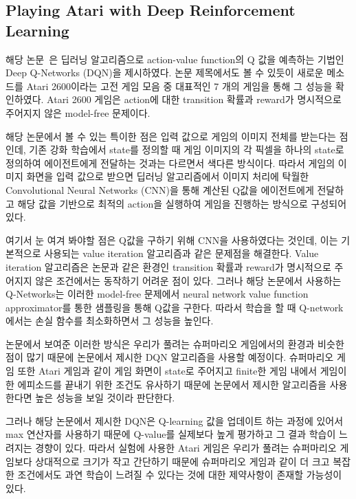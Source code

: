 \subsection{Playing Atari with Deep Reinforcement Learning}
\label{sec:survey:DQN}
해당 논문~\cite{DQN}은 딥러닝 알고리즘으로 action-value function의 Q 값을 예측하는 기법인 Deep Q-Networks (DQN)을 제시하였다. 
논문 제목에서도 볼 수 있듯이 새로운 메소드를 Atari 2600이라는 고전 게임 모음 중 대표적인 7 개의 게임을 통해 그 성능을 확인하였다. 
Atari 2600 게임은 action에 대한 transition 확률과 reward가 명시적으로 주어지지 않은 model-free 문제이다.

해당 논문에서 볼 수 있는 특이한 점은 입력 값으로 게임의 이미지 전체를 받는다는 점인데, 기존 강화 학습에서 state를 정의할 때 게임 이미지의 각 픽셀을 하나의 state로 정의하여 에이전트에게 전달하는 것과는 다르면서 색다른 방식이다. 
따라서 게임의 이미지 화면을 입력 값으로 받으면 딥러닝 알고리즘에서 이미지 처리에 탁월한 Convolutional Neural Networks (CNN)을 통해 계산된 Q값을 에이전트에게 전달하고 해당 값을 기반으로 최적의 action을 실행하여 게임을 진행하는 방식으로 구성되어 있다. 

여기서 눈 여겨 봐야할 점은 Q값을 구하기 위해 CNN을 사용하였다는 것인데, 이는 기본적으로 사용되는 value iteration 알고리즘과 같은 문제점을 해결한다. 
Value iteration 알고리즘은 논문과 같은 환경인 transition 확률과 reward가 명시적으로 주어지지 않은 조건에서는 동작하기 어려운 점이 있다. 
그러나 해당 논문에서 사용하는 Q-Networks는 이러한 model-free 문제에서 neural network value function approximator를 통한 샘플링을 통해 Q값을 구한다. 
따라서 학습을 할 때 Q-network에서는 손실 함수를 최소화하면서 그 성능을 높인다. 

논문에서 보여준 이러한 방식은 우리가 풀려는 슈퍼마리오 게임에서의 환경과 비슷한 점이 많기 때문에 논문에서 제시한 DQN 알고리즘을 사용할 예정이다. 
슈퍼마리오 게임 또한 Atari 게임과 같이 게임 화면이 state로 주어지고 finite한 게임 내에서 게임이 한 에피소드를 끝내기 위한 조건도 유사하기 때문에 논문에서 제시한 알고리즘을 사용한다면 높은 성능을 보일 것이라 판단한다. 

그러나 해당 논문에서 제시한 DQN은 Q-learning 값을 업데이트 하는 과정에 있어서 max 연산자를 사용하기 때문에 Q-value를 실제보다 높게 평가하고 그 결과 학습이 느려지는 경향이 있다. 
따라서 실험에 사용한 Atari 게임은 우리가 풀려는 슈퍼마리오 게임보다 상대적으로 크기가 작고 간단하기 때문에 슈퍼마리오 게임과 같이 더 크고 복잡한 조건에서도 과연 학습이 느려질 수 있다는 것에 대한 제약사항이 존재할 가능성이 있다. 


